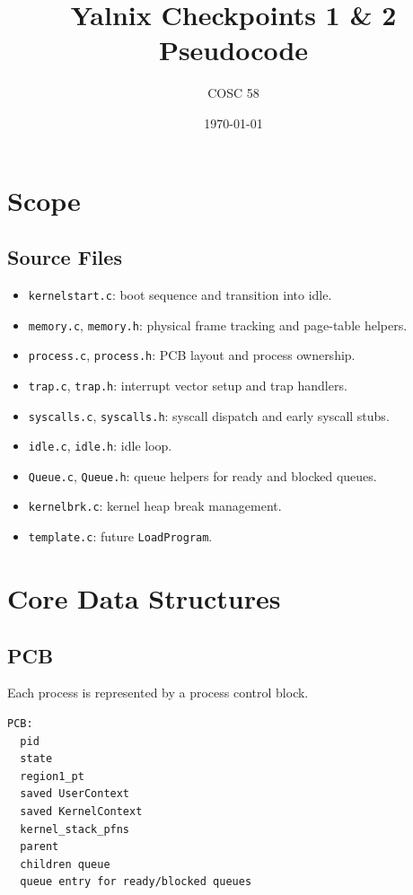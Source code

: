 \documentclass[11pt]{article}
\title{Yalnix Checkpoints 1 \& 2 Pseudocode}
\author{COSC 58}
\date{\today}
\begin{document}
\maketitle

\section{Scope}

\subsection{Source Files}

\begin{itemize}[noitemsep]
  \item \texttt{kernelstart.c}: boot sequence and transition into idle.
  \item \texttt{memory.c}, \texttt{memory.h}: physical frame tracking and page-table helpers.
  \item \texttt{process.c}, \texttt{process.h}: PCB layout and process ownership.
  \item \texttt{trap.c}, \texttt{trap.h}: interrupt vector setup and trap handlers.
  \item \texttt{syscalls.c}, \texttt{syscalls.h}: syscall dispatch and early syscall stubs.
  \item \texttt{idle.c}, \texttt{idle.h}: idle loop.
  \item \texttt{Queue.c}, \texttt{Queue.h}: queue helpers for ready and blocked queues.
  \item \texttt{kernelbrk.c}: kernel heap break management.
  \item \texttt{template.c}: future \texttt{LoadProgram}.
\end{itemize}

\section{Core Data Structures}

\subsection{PCB}

Each process is represented by a process control block.

\begin{lstlisting}[style=yalnixpseudo]
PCB:
  pid
  state
  region1_pt
  saved UserContext
  saved KernelContext
  kernel_stack_pfns
  parent
  children queue
  queue entry for ready/blocked queues
\end{lstlisting}
\end{document}
